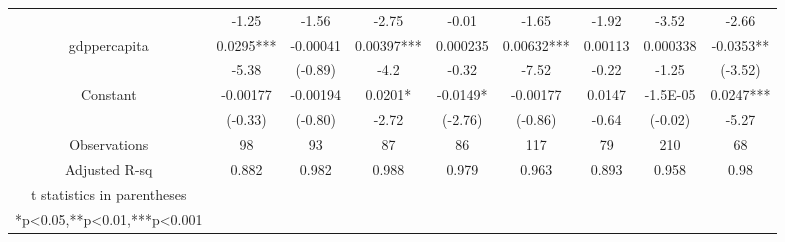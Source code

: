 \begin{table}
{\begin{tabular}{ccccccccc}
                                        & -1.25     & -1.56       & -2.75      & -0.01       & -1.65      & -1.92          & -3.52      & -2.66       \\
            gdppercapita                & 0.0295*** & -0.00041    & 0.00397*** & 0.000235    & 0.00632*** & 0.00113        & 0.000338   & -0.0353**   \\
                                        & -5.38     & (-0.89)     & -4.2       & -0.32       & -7.52      & -0.22          & -1.25      & (-3.52)     \\
            Constant                    & -0.00177  & -0.00194    & 0.0201*    & -0.0149*    & -0.00177   & 0.0147         & -1.5E-05   & 0.0247***   \\
                                        & (-0.33)   & (-0.80)     & -2.72      & (-2.76)     & (-0.86)    & -0.64          & (-0.02)    & -5.27       \\
            \midrule
            Observations                & 98        & 93          & 87         & 86          & 117        & 79             & 210        & 68          \\
            Adjusted R-sq               & 0.882     & 0.982       & 0.988      & 0.979       & 0.963      & 0.893          & 0.958      & 0.98        \\
            \midrule
            t statistics in parentheses &           &             &            &             &            &                &            &             \\
            *p<0.05,**p<0.01,***p<0.001 &           &             &            &             &            &                &            &             \\
            \bottomrule
        \end{tabular}}%
    \label{taxhandleregressionresult}%
\end{table}%


